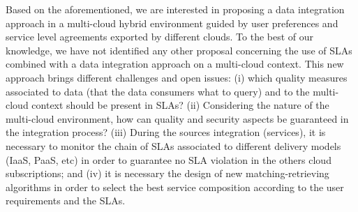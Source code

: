 \documentclass[12pt,a4paper,oneside]{report}
\begin{document}



Based on the aforementioned, we are interested in proposing a data integration approach in a multi-cloud hybrid environment guided by user preferences and service level agreements exported by different clouds.
To the best of our knowledge, we have not identified any other proposal concerning the use of SLAs combined with a data integration approach on a multi-cloud context.
This new approach brings different challenges and open issues: (i) which quality measures associated to data (that the data consumers what to query) and to the multi-cloud context should be present in SLAs? 
(ii) Considering the nature of the multi-cloud environment, how can quality and security aspects be guaranteed in the integration process? (iii) During the sources integration (services), it is necessary to monitor the chain of SLAs associated to different delivery models (IaaS, PaaS, etc) in order to guarantee no SLA violation in the others cloud subscriptions; and (iv) it is necessary the design of new matching-retrieving algorithms in order to select the best service composition according to the user requirements and the SLAs.
\end{document}
